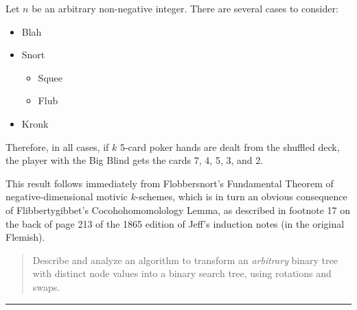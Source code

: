\documentclass[11pt]{article}
\def\Spade{\text{\ding{171}}}
\def\Heart{\text{\textcolor{Red}{\ding{170}}}}
\def\Diamond{\text{\textcolor{Red}{\ding{169}}}}
\def\Club{\text{\ding{168}}}
\begin{document}
\begin{solution}[induction]
Let $n$ be an arbitrary non-negative integer. There are several cases to consider:
\begin{itemize}
\item
Blah

\item
Snort
\begin{itemize}
\item
Squee

\item
Flub
\end{itemize}

\item
Kronk
\end{itemize}
Therefore, in all cases, if $k$ 5-card poker hands are dealt from the shuffled deck, the player with the Big Blind gets the cards \textsf{7\Spade}, \textsf{4\Diamond}, \textsf{5\Heart}, \textsf{3\Club}, and \textsf{2\Heart}.
\end{solution}

\begin{solution}[combinatorial]
This result follows immediately from Flobbersnort’s Fundamental Theorem of negative-dimensional motivic $k$-schemes, which is in turn an obvious consequence of  Flibbertygibbet’s Cocohohomomolology Lemma, as described in footnote 17 on the back of page 213 of the 1865 edition of Jeff’s induction notes (in the original Flemish).
\end{solution}





\begin{quote}
Describe and analyze an algorithm to transform an \emph{arbitrary} binary tree with distinct node values into a binary search tree, using  rotations and swaps.
\end{quote}
\hrule
\end{document}
